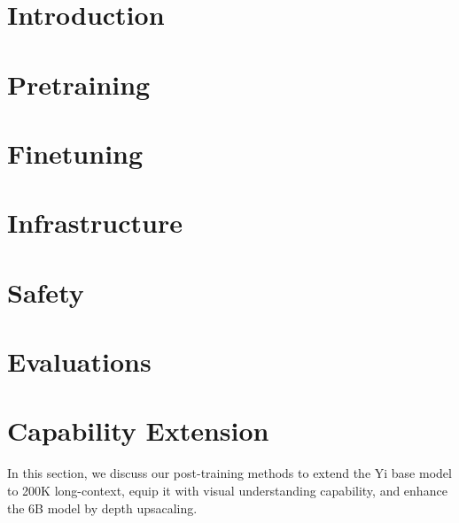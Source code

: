 \documentclass[numbers,sort&compress]{article}
\begin{document}

\clearpage
\tableofcontents
\clearpage

\section{Introduction}






\section{Pretraining}
\label{sec:pretrain}



\section{Finetuning}
\label{sec:finetuning}


\section{Infrastructure}
\label{sec:infra}


\section{Safety}
\label{sec:safety}


\section{Evaluations}
\label{sec:evaluations}



\section{Capability Extension}
In this section, we discuss our post-training methods to extend the Yi base model to 200K long-context, equip it with visual understanding capability, and enhance the 6B model by depth upsacaling.
\end{document}
